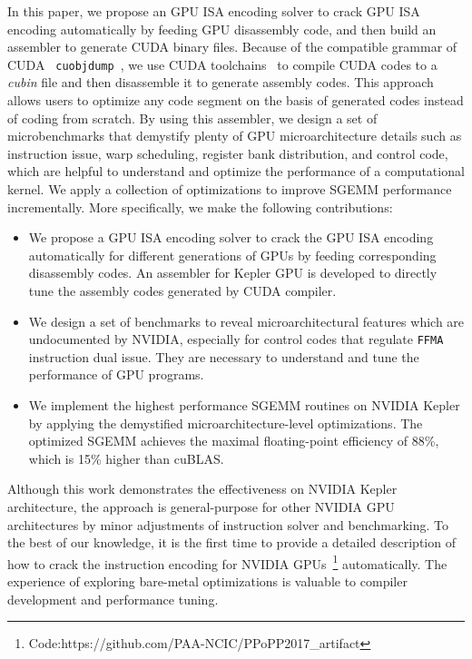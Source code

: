 In this paper, we propose an GPU ISA encoding solver to crack GPU ISA encoding automatically by feeding GPU disassembly code,
and then build an 
assembler to generate CUDA binary files. Because of the compatible grammar of CUDA {\tt 
cuobjdump}~\cite{cubin2015util}, we use CUDA toolchains~\cite{nvcc} to compile CUDA codes to a {\em cubin} file and 
then disassemble it to generate assembly codes. This approach allows users to optimize any code segment on the basis
of generated codes instead of coding from scratch. By using this assembler, we design a set of microbenchmarks that 
demystify plenty of GPU microarchitecture details such as instruction issue, warp scheduling, register bank distribution, 
and control code, which are helpful to understand and optimize the performance of a computational kernel. We apply a collection of 
optimizations to improve SGEMM performance incrementally. More specifically, we make the following contributions:
\begin{itemize}
\item We propose a GPU ISA encoding solver to crack the GPU ISA encoding
    automatically for different generations of GPUs by feeding corresponding disassembly codes.
An assembler for Kepler GPU is developed to directly tune the assembly codes generated by CUDA compiler.
\item We design a set of benchmarks to reveal microarchitectural features which are undocumented by NVIDIA, 
especially for control codes that regulate {\tt FFMA} instruction dual issue.
They are necessary to understand and tune the performance of GPU programs.
\item We implement the highest performance SGEMM routines on NVIDIA Kepler by applying the demystified 
microarchitecture-level optimizations. The optimized SGEMM achieves the maximal floating-point efficiency of 88\%, 
which is 15\% higher than cuBLAS.
\end{itemize}

Although this work demonstrates the effectiveness on NVIDIA Kepler architecture, the approach is general-purpose for 
other NVIDIA GPU architectures by minor adjustments of instruction solver and benchmarking. 
To the best of our 
knowledge, it is the first time to provide a detailed description of how to crack the instruction encoding for NVIDIA 
GPUs~\footnote{Code:https://github.com/PAA-NCIC/PPoPP2017\_artifact} automatically. 
The experience of 
exploring bare-metal optimizations is valuable to compiler development and performance tuning.

